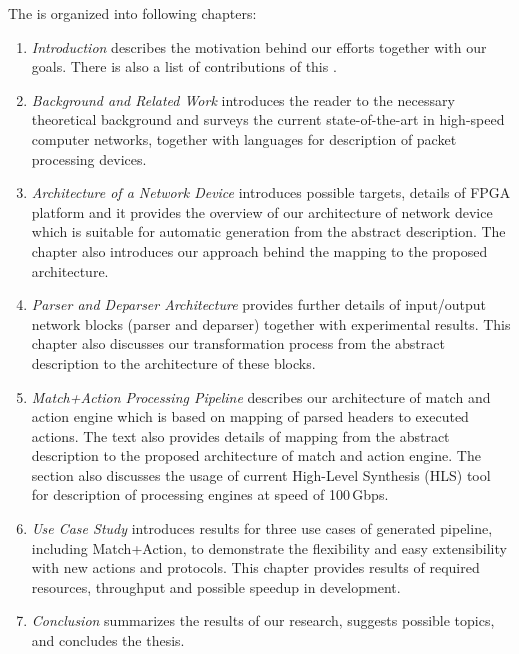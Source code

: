 The \thesis{} is organized into following chapters:
\begin{enumerate}
    \item \emph{Introduction} describes the motivation behind our efforts together with our goals. There is also a list of contributions 
    of this \thesis{}.
    \item \emph{Background and Related Work} introduces the reader to the necessary theoretical background and surveys the current 
    state-of-the-art in high-speed computer networks, together with languages for description of packet processing devices.
    \item \emph{Architecture of a Network Device} introduces possible targets, details of FPGA platform and it provides the overview of 
    our architecture of network device which is suitable for automatic generation from the abstract description. 
    The chapter also introduces our approach behind the mapping to the proposed architecture.
    \item \emph{Parser and Deparser Architecture} provides further details of input/output network blocks (parser and deparser) together with
    experimental results. 
    This chapter also discusses our transformation process from the abstract description to the architecture of these blocks.
    \item \emph{Match+Action Processing Pipeline} describes our architecture of match and action engine which is based on 
    mapping of parsed headers to executed actions. 
    The text also provides details of mapping from the abstract description to the proposed architecture of match and action engine. 
    The section also discusses the usage of current High-Level Synthesis (HLS) tool for description of processing engines at speed of 100\,Gbps.
    \item \emph{Use Case Study} introduces results for three use cases of generated pipeline, including Match+Action, to demonstrate the flexibility and
    easy extensibility with new actions and protocols.  
    This chapter provides results of required resources, throughput and possible speedup in development.
    \item \emph{Conclusion} summarizes the results of our research, suggests possible topics, and concludes the thesis.
\end{enumerate}
